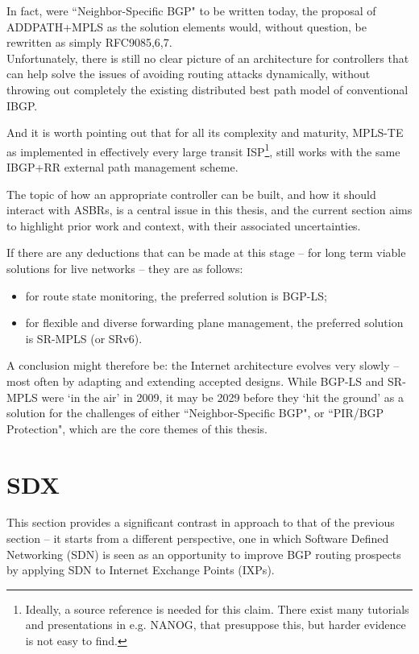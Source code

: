 In fact, were ``Neighbor-Speciﬁc BGP" to be written today, the proposal of ADDPATH+MPLS as the solution elements would, without question, be rewritten as simply RFC908{5,6,7}.
\\
Unfortunately, there is still no clear picture of an architecture for controllers that can help solve the issues of avoiding routing attacks dynamically, without throwing out completely the existing distributed best path model of conventional IBGP.

And it is worth pointing out that for all its complexity and maturity, MPLS-TE as implemented in effectively every large transit ISP\footnote{Ideally, a source reference is needed for this claim.  There exist many tutorials and presentations in e.g. NANOG, that presuppose this, but harder evidence is not easy to find.}, still works with the same IBGP+RR external path management scheme.

The topic of how an appropriate controller can be built, and how it should interact with ASBRs, is a central issue in this thesis, and the current section aims to highlight prior work and context, with their associated uncertainties.


If there are any deductions that can be made at this stage -- for long term viable solutions for live networks -- they are as follows:
\begin{itemize}
    \item for route state monitoring, the preferred solution is BGP-LS;
    \item for flexible and diverse forwarding plane management, the preferred solution is SR-MPLS (or SRv6).
\end{itemize}

A conclusion might therefore be: the Internet architecture evolves very slowly -- most often by adapting and extending accepted designs.  While BGP-LS and SR-MPLS were `in the air' in 2009, it may be 2029 before they `hit the ground' as a solution for the challenges of either ``Neighbor-Speciﬁc BGP", or ``PIR/BGP Protection", which are the core themes of this thesis.


\section{SDX}

This section provides a significant contrast in approach to that of the previous section -- it starts from a different perspective, one in which Software Defined Networking (SDN) is seen as an opportunity to improve BGP routing prospects by applying SDN to Internet Exchange Points (IXPs).

